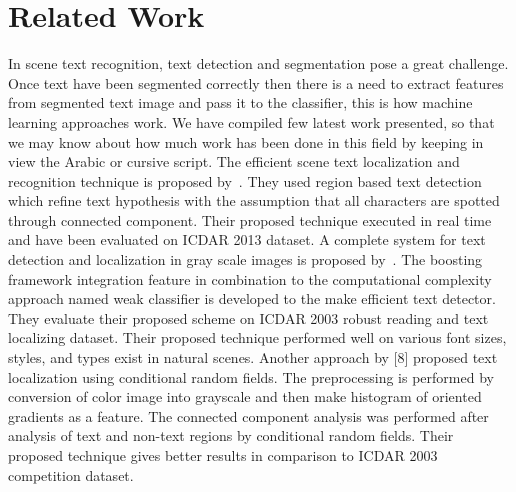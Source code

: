 \documentclass[conference]{IEEEtran}
\begin{document}
\section{Related Work}
In scene text recognition, text detection and segmentation pose a great challenge.
Once text have been segmented correctly then there is a need to extract features from segmented text image and pass it to the classifier, this is how machine learning approaches work.
We have compiled few latest work presented, so that we may know about how much work has been done in this field by keeping in view the Arabic or cursive script.
The efficient scene text localization and recognition technique is proposed by~\cite{es}.
They used region based text  detection which refine text hypothesis with the assumption that all characters are spotted through connected component. Their proposed technique executed in real time and have been evaluated on ICDAR 2013 dataset. A complete system for text detection and localization in gray scale images is proposed by~\cite{td}.
The boosting framework integration feature in combination to the computational complexity approach named weak classifier is developed to the make efficient text detector.
They evaluate their proposed scheme on ICDAR 2003 robust reading and text localizing dataset.
Their proposed technique performed well on various font sizes, styles, and types exist in natural scenes. Another approach by [8] proposed text localization using conditional random fields. The preprocessing is performed by conversion of color image into grayscale and then make histogram of oriented gradients as a feature. The connected component analysis was performed after analysis of text and non-text regions by conditional random fields. Their proposed technique gives better results in comparison to ICDAR 2003 competition dataset.
\end{document}
